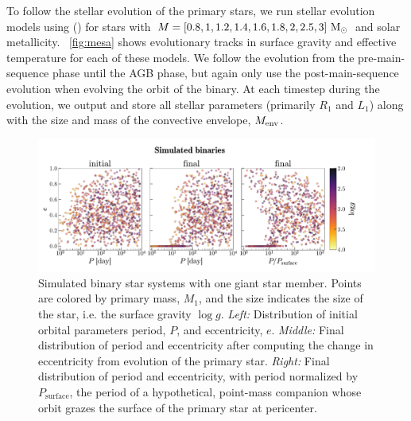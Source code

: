 \documentclass[modern, letterpaper]{aastex62}
\newcommand{\Psurf}{\ensuremath{P_\textrm{surface}}}
\begin{document}
To follow the stellar evolution of the primary stars, we run stellar evolution
models using  (\citealt{Paxton:2011}) for stars with $M = [0.8, 1,
1.2, 1.4, 1.6, 1.8, 2, 2.5, 3]~\mathrm{M}_\odot$ and solar metallicity.
\figurename~\ref{fig:mesa} shows evolutionary tracks in surface gravity and
effective temperature for each of these models.
We follow the evolution from the pre-main-sequence phase until the AGB phase,
but again only use the post-main-sequence evolution when evolving the orbit of
the binary.
At each timestep during the evolution, we output and store all stellar parameters (primarily $R_1$ and $L_1$) along with the size and mass of the convective envelope, $M_{\rm env}$.

\begin{figure}[htbp]
\begin{center}
\includegraphics[trim={0 0 1cm 0}, clip, width=\linewidth]{simulated}
\end{center}
\caption{%
Simulated binary star systems with one giant star member.
Points are colored by primary mass, $M_1$, and the size indicates the size of
the star, i.e. the surface gravity $\log g$.
\textit{Left:} Distribution of initial orbital parameters period, $P$, and
eccentricity, $e$.
\textit{Middle:} Final distribution of period and eccentricity after computing
the change in eccentricity from evolution of the primary star.
\textit{Right:} Final distribution of period and eccentricity, with period
normalized by \Psurf, the period of a hypothetical, point-mass
companion whose orbit grazes the surface of the primary star at pericenter.
\label{fig:simulated}
}
\end{figure}
\end{document}
